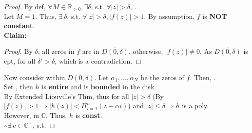 \documentclass[12pt,a4paper]{article}
\begin{document}
\begin{proof}
  By def, $\forall M \in \mathbb{R}_{> 0}, \exists \delta$, s.t. $\forall |z| > \delta$, . \\

  \noindent Let $M = 1$. Thus, $\exists\ \delta$, s.t. $\forall |z| > \delta, |f(z)| > 1$. By assumption, $f$ is \textbf{NOT constant}. \\

  \noindent \textbf{Claim:} 
  \begin{proof}
    By $\delta$, all zeros in $f$ are in $\overline{D(0, \delta)}$, otherwise, $|f(z)| \neq 0$. As $\overline{D(0, \delta)}$ is cpt,   for all $\delta' > \delta$, which is a contradiction.
  \end{proof}

  \noindent Now consider within $\bar{D}(0, \delta)$. Let $\alpha_1, \dots, \alpha_N$ be the zeros of $f$. Then,  . \\

  \noindent Set , then $h$ is \textbf{entire} and is \textbf{bounded} in the disk. \\

  \noindent By Extended Liouville's Thm, thus  for all $|z| > \delta$ (By $|f(z)| > 1 \Rightarrow |h(z)| < \Pi_{i = 1}^n (z - \alpha i)$) and $|z| \leq \delta \Rightarrow h$ is a poly. \\

  \noindent However,  in $\mathbb{C}$. Thus, $h$ is \textbf{const}. \\

  \noindent $\therefore \exists\ c \in \mathbb{C}^\times$, s.t. 
\end{proof}

\vspace{1.0em}

\end{document}
